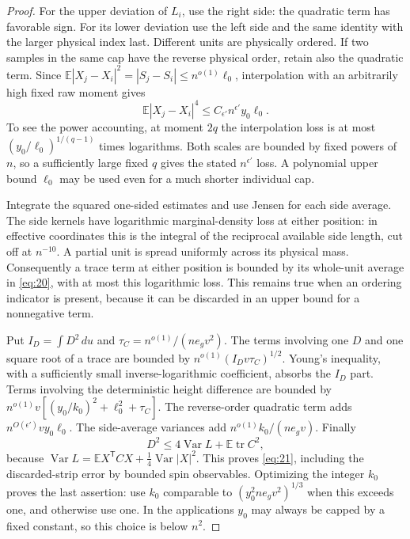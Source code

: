 \begin{proof}
For the upper deviation of $L_i$, use the right side: the quadratic
term has favorable sign.  For its lower deviation use the left side
and the same identity with the larger physical index last.  Different
units are physically ordered.  If two samples in the same cap have
the reverse physical order, retain also the quadratic term.  Since
$\mathbb E|X_j-X_i|^2=|S_j-S_i|\le n^{o(1)}\ell_0$, interpolation
with an arbitrarily high fixed raw moment gives
\[
 \mathbb E|X_j-X_i|^4\le C_{\epsilon'}n^{\epsilon'}y_0\ell_0.
\]
To see the power accounting, at moment $2q$ the interpolation loss is
at most $(y_0/\ell_0)^{1/(q-1)}$ times logarithms.  Both scales are
bounded by fixed powers of $n$, so a sufficiently large fixed $q$
gives the stated $n^{\epsilon'}$ loss.  A polynomial upper bound
$\ell_0$ may be used even for a much shorter individual cap.

Integrate the squared one-sided estimates and use Jensen for each
side average.  The side kernels have logarithmic marginal-density
loss at either position: in effective coordinates this is the
integral of the reciprocal available side length, cut off at
$n^{-10}$.  A partial unit is spread uniformly across its physical
mass.  Consequently a trace term at either position is bounded by
its whole-unit average in \eqref{eq:20}, with at most this logarithmic
loss.  This remains true when an ordering indicator is present,
because it can be discarded in an upper bound for a nonnegative term.

Put $I_D=\int D^2\,du$ and
$\tau_C=n^{o(1)}/(ne_gv^2)$.  The terms involving one $D$ and one
square root of a trace are bounded by
$n^{o(1)}(I_Dv\tau_C)^{1/2}$.  Young's inequality, with a sufficiently
small inverse-logarithmic coefficient, absorbs the $I_D$ part.  Terms
involving the deterministic height difference are bounded by
$n^{o(1)}v[(y_0/k_0)^2+\ell_0^2+\tau_C]$.
The reverse-order quadratic term adds
$n^{O(\epsilon')}vy_0\ell_0$.  The side-average variances add
$n^{o(1)}k_0/(ne_gv)$.
Finally
\[
 D^2\le4\operatorname{Var}L+\mathbb E\operatorname{tr}C^2,
\]
because $\operatorname{Var}L
=\mathbb E X^{\mathsf T}CX+\tfrac14\operatorname{Var}|X|^2$.
This proves \eqref{eq:21}, including the discarded-strip error by
bounded spin observables.  Optimizing the integer $k_0$ proves the last
assertion: use $k_0$ comparable to $(y_0^2ne_gv^2)^{1/3}$ when this
exceeds one, and otherwise use one.  In the applications $y_0$ may
always be capped by a fixed constant, so this choice is below $n^2$.
\end{proof}

